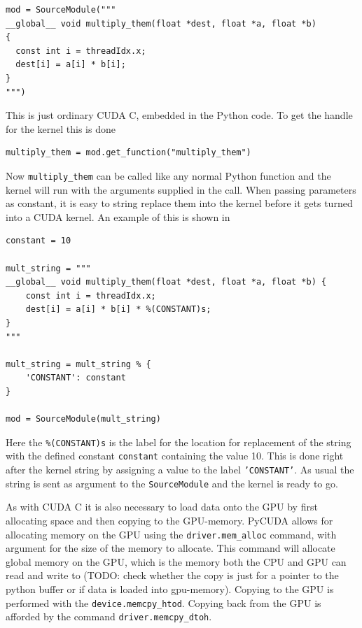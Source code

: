 \begin{verbatim}
mod = SourceModule("""
__global__ void multiply_them(float *dest, float *a, float *b)
{
  const int i = threadIdx.x;
  dest[i] = a[i] * b[i];
}
""")
\end{verbatim}

This is just ordinary CUDA C, embedded in the Python code. To get the handle for the kernel this is done

\begin{verbatim}
multiply_them = mod.get_function("multiply_them")
\end{verbatim}

Now \texttt{multiply\_them} can be called like any normal Python function and the kernel will run with the arguments supplied in the call. When passing parameters as constant, it is easy to string replace them into the kernel before it gets turned into a CUDA kernel. An example of this is shown in 

\begin{lstlisting}
constant = 10

mult_string = """
__global__ void multiply_them(float *dest, float *a, float *b) {
    const int i = threadIdx.x;
    dest[i] = a[i] * b[i] * %(CONSTANT)s;
}
"""

mult_string = mult_string % {
    'CONSTANT': constant
}

mod = SourceModule(mult_string)
\end{lstlisting}

Here the \texttt{\%(CONSTANT)s} is the label for the location for replacement of the string with the defined constant \texttt{constant} containing the value 10. This is done right after the kernel string by assigning a value to the label \texttt{'CONSTANT'}. As usual the string is sent as argument to the \texttt{SourceModule} and the kernel is ready to go.

As with CUDA C it is also necessary to load data onto the GPU by first allocating space and then copying to the GPU-memory. PyCUDA allows for allocating memory on the GPU using the \texttt{driver.mem\_alloc} command, with argument for the size of the memory to allocate. This command will allocate global memory on the GPU, which is the memory both the CPU and GPU can read and write to (TODO: check whether the copy is just for a pointer to the python buffer or if data is loaded into gpu-memory). Copying to the GPU is performed with the \texttt{device.memcpy\_htod}. Copying back from the GPU is afforded by the command \texttt{driver.memcpy\_dtoh}.

